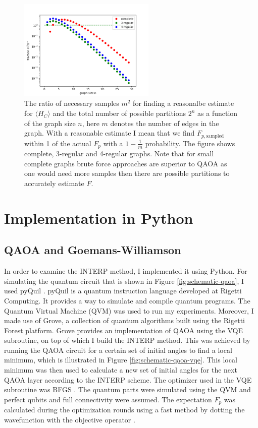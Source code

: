 \begin{figure}[H]
	\centering
	\includegraphics[width=0.58\textwidth]{figures/fraction.png}
	\caption{The ratio of necessary samples $m^2$ for finding a reasonalbe estimate for $\langle H_C \rangle$ and the total number of possible partitions $2^n$ as a function of the graph size $n$, here $m$ denotes the number of edges in the graph. With a reasonable estimate I mean that we find $F_{p, \text{sampled}}$ within 1 of the actual $F_p$ with a $1-\frac{1}{m}$ probability. The figure shows complete, 3-regular and  4-regular graphs. Note that for small complete graphs brute force approaches are superior to QAOA as one would need more samples then there are possible partitions to accurately estimate $F$.}
	\label{fig:fraction}
\end{figure}


\section{Implementation in Python}
\subsection{QAOA and Goemans-Williamson}
In order to examine the INTERP method, I implemented it using Python. For simulating the quantum circuit that is shown in Figure \ref{fig:schematic-qaoa}, I used pyQuil \cite{pyQuil}. pyQuil is a quantum instruction language developed at Rigetti Computing. It provides a way to simulate and compile quantum programs. The Quantum Virtual Machine (QVM) was used to run my experiments. Moreover, I made use of Grove, a collection of quantum algorithms built using the Rigetti Forest platform. Grove provides an implementation of QAOA using the VQE subroutine, on top of which I build the INTERP method. This was achieved by running the QAOA circuit for a certain set of initial angles to find a local minimum, which is illustrated in Figure \ref{fig:schematic-qaoa-vqe}. This local minimum was then used to calculate a new set of initial angles for the next QAOA layer according to the INTERP scheme. The optimizer used in the VQE subroutine was BFGS \cite{BFGS}. The quantum parts were simulated using the QVM and perfect qubits and full connectivity were assumed. The expectation $F_p$ was calculated during the optimization rounds using a fast method by dotting the wavefunction with the objective operator \cite{pyQuil}.

